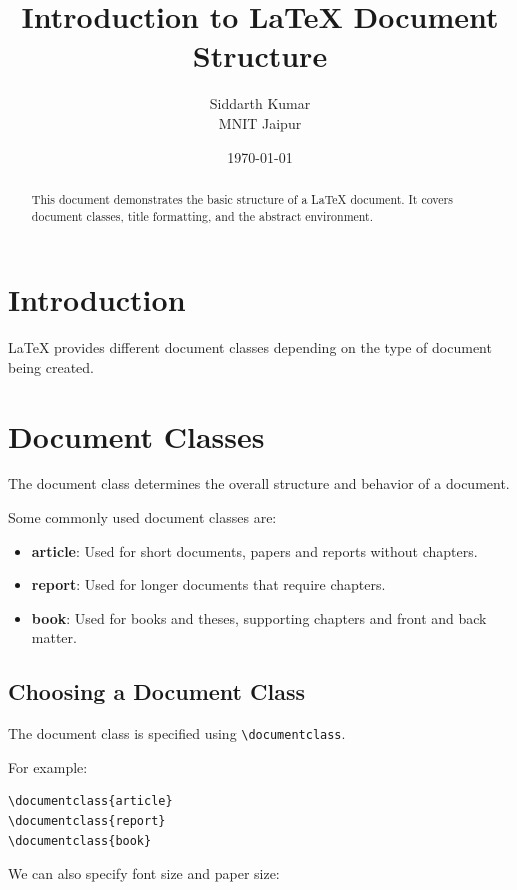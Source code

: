\documentclass[12pt,a4paper]{article}
\title{\Huge\bfseries Introduction to LaTeX Document Structure}
\author{
    Siddarth Kumar \\
    \small MNIT Jaipur
}
\date{\today}
\begin{document}
\maketitle

\begin{abstract}
This document demonstrates the basic structure of a
LaTeX document. It covers document classes, title
formatting, and the abstract environment.
\end{abstract}

\section{Introduction}

LaTeX provides different document classes depending
on the type of document being created.

\section{Document Classes}

The document class determines the overall structure
and behavior of a document.

Some commonly used document classes are:

\begin{itemize}
    \item \textbf{article}: Used for short documents,
    papers and reports without chapters.

    \item \textbf{report}: Used for longer documents
    that require chapters.

    \item \textbf{book}: Used for books and theses,
    supporting chapters and front and back matter.
\end{itemize}

\subsection{Choosing a Document Class}

The document class is specified using
\texttt{\textbackslash documentclass}.

For example:

\begin{verbatim}
\documentclass{article}
\documentclass{report}
\documentclass{book}
\end{verbatim}

We can also specify font size and paper size:
\end{document}

